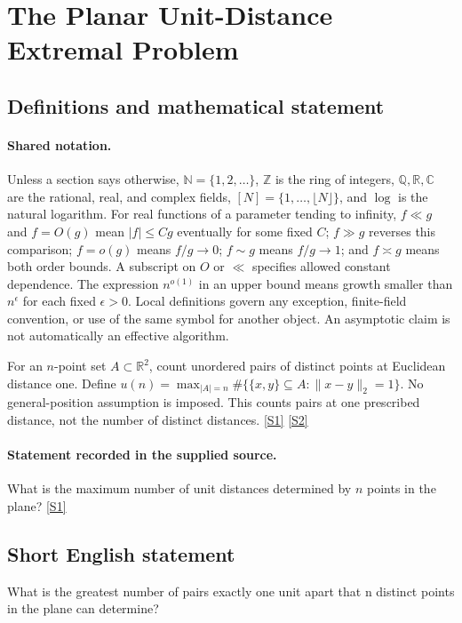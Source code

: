 \documentclass[11pt,a4paper]{article}
\newcommand{\N}{\mathbb{N}}
\newcommand{\Z}{\mathbb{Z}}
\newcommand{\Q}{\mathbb{Q}}
\newcommand{\R}{\mathbb{R}}
\newcommand{\C}{\mathbb{C}}
\newcommand{\sref}[2]{\hyperlink{source:#1:#2}{[S#2]}}
\begin{document}
\section{The Planar Unit-Distance Extremal Problem}\label{statement}


\subsection{Definitions and mathematical statement}

\paragraph{Shared notation.}Unless a section says otherwise, $\N=\{1,2,\ldots\}$,
$\Z$ is the ring of integers, $\Q,\R,\C$ are the rational, real, and complex
fields, $[N]=\{1,\ldots,\lfloor N\rfloor\}$, and $\log$ is the natural
logarithm. For real functions of a parameter tending to infinity,
$f\ll g$ and $f=O(g)$ mean $|f|\leq Cg$ eventually for some fixed $C$;
$f\gg g$ reverses this comparison; $f=o(g)$ means $f/g\to0$;
$f\sim g$ means $f/g\to1$; and $f\asymp g$ means both order bounds.
A subscript on $O$ or $\ll$ specifies allowed constant dependence.
The expression $n^{o(1)}$ in an upper bound means growth smaller than
$n^\epsilon$ for each fixed $\epsilon>0$. Local definitions govern any
exception, finite-field convention, or use of the same symbol for another
object. An asymptotic claim is not automatically an effective algorithm.



For an $n$-point set $A\subset\R^2$, count unordered pairs of distinct points at Euclidean distance one. Define $u(n)=\max_{|A|=n}\#\{\{x,y\}\subseteq A:\|x-y\|_2=1\}$. No general-position assumption is imposed. This counts pairs at one prescribed distance, not the number of distinct distances. \sref{statement}{1} \sref{statement}{2}

\paragraph{Statement recorded in the supplied source.}
What is the maximum number of unit distances determined by $n$ points in the plane? \sref{statement}{1}

\subsection{Short English statement}

What is the greatest number of pairs exactly one unit apart that n distinct points in the plane can determine?
\end{document}
